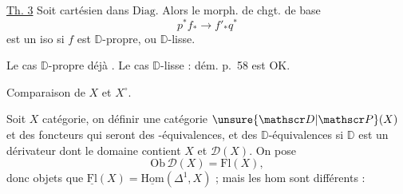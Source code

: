 
\uline{Th. 3} Soit
cartésien dans $\mathrm{Diag}$. Alors le morph. de chgt. de base
\[
p^* f_* \longrightarrow f'_* q^*
\]
est un iso si $f$ est $\mathbb D$-propre, ou   $\mathbb D$-lisse.

Le cas $\mathbb D$-propre déjà . Le cas $\mathbb D$-lisse :   dém. p.~58 est OK.


Comparaison de $X$ et $X^\circ$.

Soit $X$  catégorie, on  définir une catégorie $\unsure{\mathscr D|\mathscr P}(X)$ et des foncteurs
qui seront des -équivalences, et des $\mathbb D$-équivalences si $\mathbb D$ est un dérivateur dont le domaine contient $X$ et $\mathscr D(X)$. On pose
\[
\mathrm{Ob}\,\mathscr D(X)=\mathrm{Fl}(X),
\]
donc  objets que $\underline{\mathrm{Fl}}(X)=\underline{\mathrm{Hom}}(\Delta^1,X)$ ; mais les hom sont différents :

